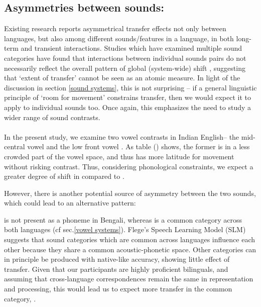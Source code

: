 \documentclass[11pt]{article}
\newcommand{\nt}[1]{\textipa{[#1]}} %
\begin{document}
 
 \subsection{Asymmetries between sounds:}\label{asymmetry between sounds}
 
 Existing research reports asymmetrical transfer effects not only between languages, but also among different sounds/features in a language, in both long-term and transient interactions. Studies which have examined multiple sound categories have found that interactions between individual sounds pairs do not necessarily reflect the overall pattern of global (system-wide) shift \cite{chang2012rapid,elias2017effects}, suggesting that `extent of transfer' cannot be seen as an atomic measure. In light of the discussion in section \ref{sound systems}, this is not surprising -- if a general linguistic principle of `room for movement' constrains transfer, then we would expect it to apply to individual sounds too. Once again, this emphasizes the need to study a wider range of sound contrasts.
 
 \paragraph{}In the present study, we examine two vowel contrasts in Indian English-- the mid-central vowel \nt{2} and the low front vowel \nt{\ae}. As table () shows, the former is in a less crowded part of the vowel space, and thus has more latitude for movement without risking contrast. Thus, considering phonological constraints, we expect a greater degree of shift in \nt{2} compared to \nt{\ae}.

 However, there is another potential source of asymmetry between the two sounds, which could lead to an alternative pattern:
 
 \nt{2} is not present as a phoneme in Bengali, whereas \nt{\ae} is a common category across both languages (cf sec.\ref{vowel systems}). Flege's Speech Learning Model (SLM) \cite{flege1995second,flege2007language} suggests that sound categories which are common across languages influence each other because they share a common acoustic-phonetic space. Other categories can in principle be produced with native-like accuracy, showing little effect of transfer. Given that our participants are highly proficient bilinguals, and assuming that cross-language correspondences remain the same in representation and processing, this would lead us to expect more transfer in the common category, \nt{\ae}. 
 
\end{document}
